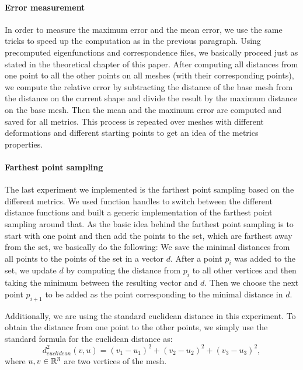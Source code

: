 \paragraph{Error measurement}
In order to measure the maximum error and the mean error, we use the same tricks to speed up the computation as in the previous paragraph.
Using precomputed eigenfunctions and correspondence files, we basically proceed just as stated in the theoretical chapter of this paper.
After computing all distances from one point to all the other points on all meshes (with their corresponding points), we compute the relative error by subtracting the distance of the base mesh from the distance on the current shape and divide the result by the maximum distance on the base mesh.
Then the mean and the maximum error are computed and saved for all metrics.
This process is repeated over meshes with different deformations and different starting points to get an idea of the metrics properties.


\paragraph{Farthest point sampling}
The last experiment we implemented is the farthest point sampling based on the different metrics.
We used function handles to switch between the different distance functions and built a generic implementation of the farthest point sampling around that.
As the basic idea behind the farthest point sampling is to start with one point and then add the points to the set, which are farthest away from the set, we basically do the following:
We save the minimal distances from all points to the points of the set in a vector $d$.
After a point $p_i$ was added to the set, we update $d$ by computing the distance from $p_i$ to all other vertices and then taking the minimum between the resulting vector and $d$.
Then we choose the next point $p_{i+1}$ to be added as the point corresponding to the minimal distance in $d$.

Additionally, we are using the standard euclidean distance in this experiment.
To obtain the distance from one point to the other points, we simply use the standard formula for the euclidean distance as:
\begin{equation}
	d_{euclidean}^2(v,u) = (v_1 -u_1)^2 + (v_2 - u_2)^2 + (v_3 - u_3)^2,
\end{equation}
where $u,v\in \mathbb{R}^3$ are two vertices of the mesh.
